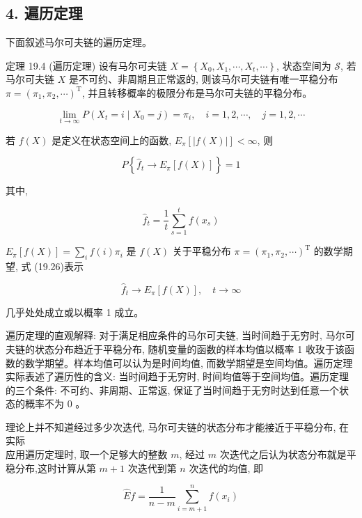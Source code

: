 \documentclass[10pt]{article}
\begin{document}
\begin{CJK*}{UTF8}{bsmi}
\section*{4. 遍历定理}
下面叙述马尔可夫链的遍历定理。

定理 19.4 (遍历定理) 设有马尔可夫链 $X=\left\{X_{0}, X_{1}, \cdots, X_{t}, \cdots\right\}$, 状态空间为 $\mathcal{S}$, 若马尔可夫链 $X$ 是不可约、非周期且正常返的, 则该马尔可夫链有唯一平稳分布 $\pi=\left(\pi_{1}, \pi_{2}, \cdots\right)^{\mathrm{T}}$, 并且转移概率的极限分布是马尔可夫链的平稳分布。


\begin{equation*}
\lim _{t \rightarrow \infty} P\left(X_{t}=i \mid X_{0}=j\right)=\pi_{i}, \quad i=1,2, \cdots, \quad j=1,2, \cdots \tag{19.25}
\end{equation*}


若 $f(X)$ 是定义在状态空间上的函数, $E_{\pi}[|f(X)|]<\infty$, 则


\begin{equation*}
P\left\{\hat{f}_{t} \rightarrow E_{\pi}[f(X)]\right\}=1 \tag{19.26}
\end{equation*}


其中,

$$
\hat{f}_{t}=\frac{1}{t} \sum_{s=1}^{t} f\left(x_{s}\right)
$$

$E_{\pi}[f(X)]=\sum_{i} f(i) \pi_{i}$ 是 $f(X)$ 关于平稳分布 $\pi=\left(\pi_{1}, \pi_{2}, \cdots\right)^{\mathrm{T}}$ 的数学期望, 式 (19.26)表示


\begin{equation*}
\hat{f}_{t} \rightarrow E_{\pi}[f(X)], \quad t \rightarrow \infty \tag{19.27}
\end{equation*}


几乎处处成立或以概率 1 成立。

遍历定理的直观解释: 对于满足相应条件的马尔可夫链, 当时间趋于无穷时, 马尔可夫链的状态分布趋近于平稳分布, 随机变量的函数的样本均值以概率 1 收玫于该函数的数学期望。样本均值可以认为是时间均值, 而数学期望是空间均值。遍历定理实际表述了遍历性的含义: 当时间趋于无穷时, 时间均值等于空间均值。遍历定理的三个条件: 不可约、非周期、正常返, 保证了当时间趋于无穷时达到任意一个状态的概率不为 0 。

理论上并不知道经过多少次迭代, 马尔可夫链的状态分布才能接近于平稳分布, 在实际\\
应用遍历定理时, 取一个足够大的整数 $m$, 经过 $m$ 次迭代之后认为状态分布就是平稳分布,这时计算从第 $m+1$ 次迭代到第 $n$ 次迭代的均值, 即


\begin{equation*}
\hat{E} f=\frac{1}{n-m} \sum_{i=m+1}^{n} f\left(x_{i}\right) \tag{19.28}
\end{equation*}



\end{CJK*}
\end{document}
